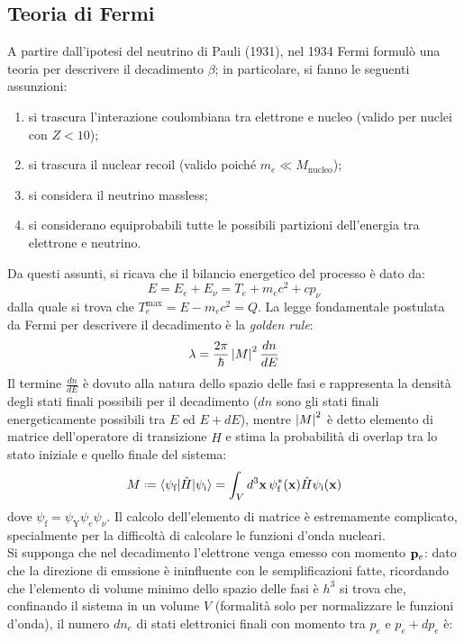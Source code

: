 \subsection{Teoria di Fermi}

A partire dall'ipotesi del neutrino di Pauli (1931), nel 1934 Fermi formulò una teoria per descrivere il decadimento $ \beta $; in particolare, si fanno le seguenti assunzioni:
\begin{enumerate}
	\item si trascura l'interazione coulombiana tra elettrone e nucleo (valido per nuclei con $ Z < 10 $);
	\item si trascura il nuclear recoil (valido poiché $ m_e \ll M_{\text{nucleo}} $);
	\item si considera il neutrino massless;
	\item si considerano equiprobabili tutte le possibili partizioni dell'energia tra elettrone e neutrino.
\end{enumerate}
Da questi assunti, si ricava che il bilancio energetico del processo è dato da:
\begin{equation}
	E = E_e + E_{\nu} = T_e + m_e c^2 + c p_{\nu}
	\label{eq:2.23}
\end{equation}
dalla quale si trova che $ T_e^{\text{max}} = E - m_e c^2 = Q $. La legge fondamentale postulata da Fermi per descrivere il decadimento è la \textit{golden rule}:
\begin{equation}
	\lambda = \frac{2\pi}{\hbar} \left\lvert M\right\rvert^2 \frac{dn}{dE}
	\label{eq:2.24}
\end{equation}
Il termine $ \frac{dn}{dE} $ è dovuto alla natura dello spazio delle fasi e rappresenta la densità degli stati finali possibili per il decadimento ($ dn $ sono gli stati finali energeticamente possibili tra $ E $ ed $ E + dE $), mentre $ \left\lvert M\right\rvert^2 $ è detto elemento di matrice dell'operatore di transizione $ \hat{H} $ e stima la probabilità di overlap tra lo stato iniziale e quello finale del sistema:
\begin{equation}
	M \defeq \braket{\psi_{\text{f}} | \hat{H} | \psi_{\text{i}}} = \int_V d^3\ve{x}\, \psi^*_{\text{f}}(\ve{x}) \hat{H} \psi_{\text{i}}(\ve{x})
	\label{eq:2.25}
\end{equation}
dove $ \psi_{\text{f}} = \psi_{\text{Y}} \psi_e \psi_{\nu} $. Il calcolo dell'elemento di matrice è estremamente complicato, specialmente per la difficoltà di calcolare le funzioni d'onda nucleari.\\
Si supponga che nel decadimento l'elettrone venga emesso con momento $ \mathbf{p}_e $: dato che la direzione di emssione è ininfluente con le semplificazioni fatte, ricordando che l'elemento di volume minimo dello spazio delle fasi è $ h^3 $ si trova che, confinando il sistema in un volume $ V $ (formalità solo per normalizzare le funzioni d'onda), il numero $ dn_e $ di stati elettronici finali con momento tra $ p_e $ e $ p_e + dp_e $ è:
